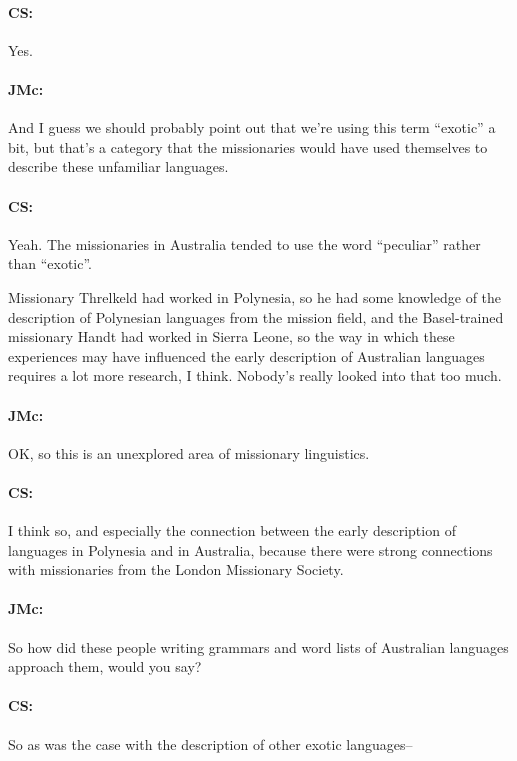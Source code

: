\documentclass[output=paper]{langscibook}
\begin{document}
\paragraph*{CS:}  Yes.


\paragraph*{JMc:}  And I guess we should probably point out that we’re using this term “exotic” a bit, but that’s a category that the missionaries would have used themselves to describe these unfamiliar languages.


\paragraph*{CS:}  Yeah. The missionaries in Australia tended to use the word “peculiar” rather than “exotic”.

Missionary Threlkeld had worked in Polynesia, so he had some knowledge of the description of Polynesian languages from the mission field, and the Basel-trained missionary Handt had worked in Sierra Leone, so the way in which these experiences may have influenced the early description of Australian languages requires a lot more research, I think. Nobody’s really looked into that too much.


\paragraph*{JMc:}  OK, so this is an unexplored area of missionary linguistics.


\paragraph*{CS:}  I think so, and especially the connection between the early description of languages in Polynesia and in Australia, because there were strong connections with missionaries from the London Missionary Society.


\paragraph*{JMc:}  So how did these people writing grammars and word lists of Australian languages approach them, would you say?


\paragraph*{CS:}  So as was the case with the description of other exotic languages–
\end{document}
